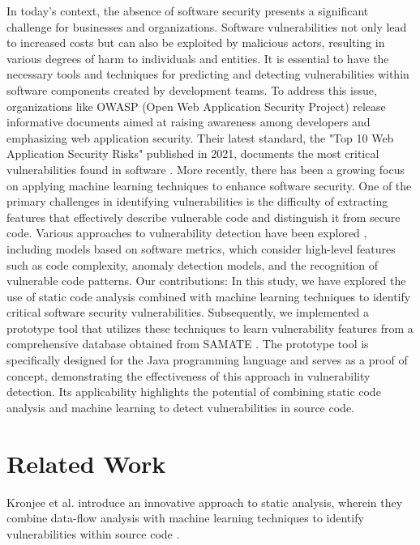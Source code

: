 \documentclass[journal,a4paper]{IEEEtran}
\begin{document}
In today's context, the absence of software security presents a significant challenge for businesses and organizations. Software vulnerabilities not only lead to increased costs but can also be exploited by malicious actors, resulting in various degrees of harm to individuals and entities. It is essential to have the necessary tools and techniques for predicting and detecting vulnerabilities within software components created by development teams.
To address this issue, organizations like OWASP (Open Web Application Security Project) release informative documents aimed at raising awareness among developers and emphasizing web application security. Their latest standard, the "Top 10 Web Application Security Risks" published in 2021, documents the most critical vulnerabilities found in software \cite{OWASP_TOP_TEN2021}.
More recently, there has been a growing focus on applying machine learning techniques to enhance software security. One of the primary challenges in identifying vulnerabilities is the difficulty of extracting features that effectively describe vulnerable code and distinguish it from secure code. Various approaches to vulnerability detection have been explored \cite{Seyed_Hamid_2022}, including models based on software metrics, which consider high-level features such as code complexity, anomaly detection models, and the recognition of vulnerable code patterns.
Our contributions: In this study, we have explored the use of static code analysis combined with machine learning techniques to identify critical software security vulnerabilities. Subsequently, we implemented a prototype tool that utilizes these techniques to learn vulnerability features from a comprehensive database obtained from SAMATE \cite{SAMATE2023}. The prototype tool is specifically designed for the Java programming language and serves as a proof of concept, demonstrating the effectiveness of this approach in vulnerability detection. Its applicability highlights the potential of combining static code analysis and machine learning to detect vulnerabilities in source code.

\section{Related Work}

Kronjee et al. \cite{Kronjee2018} introduce an innovative approach to static analysis, wherein they combine data-flow analysis with machine learning techniques to identify vulnerabilities within source code \cite{Kronjee2018}.
\end{document}
